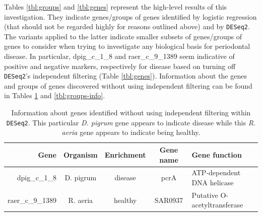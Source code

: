 \documentclass{article}
\begin{document}
Tables \ref{tbl:groups} and \ref{tbl:genes} represent the high-level results of this investigation. They indicate
genes/groups of genes identified by logistic regression (that should not be regarded highly for reasons outlined 
above) and by \texttt{DESeq2}. The variants applied to the latter indicate smaller subsets of genes/groups of genes
to consider when trying to investigate any biological basis for periodontal disease. In particular,
dpig\_c\_1\_8  and raer\_c\_9\_1389 seem indicative of positive and negative markers, respectively for disease based
on turning off \texttt{DESeq2}'s independent filtering (Table \ref{tbl:genes}). Information about the genes and groups
of genes discovered without using independent filtering can be found in Tables \ref{tbl:genes-info} and \ref{tbl:groups-info}.



\begin{table}[!h]
\begin{center}
\begin{tabular}{r|cccl}
Gene & Organism & Enrichment & Gene name & Gene function\\
\hline
dpig\_c\_1\_8 & D. pigrum & disease & pcrA & ATP-dependent DNA helicase\\
raer\_c\_9\_1389 & R. aeria & healthy & SAR0937 & Putative O-acetyltransferase
\end{tabular}
\caption{\label{tbl:genes-info}Information about genes identified without using independent filtering within \texttt{DESeq2}. This particular \emph{D. pigrum} gene appears to indicate disease while this \emph{R. aeria}
gene appears to indicate being healthy.}
\end{center}
\end{table}
\end{document}
